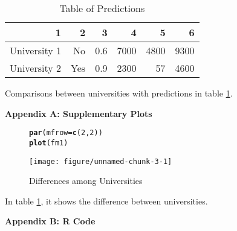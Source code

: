 \documentclass{article}\usepackage[]{graphicx}\usepackage[]{color}
\makeatletter
\def\maxwidth{ %
  \ifdim\Gin@nat@width>\linewidth
    \linewidth
  \else
    \Gin@nat@width
  \fi
}
\newcommand{\hlnum}[1]{\textcolor[rgb]{0.686,0.059,0.569}{#1}}%
\newcommand{\hlstd}[1]{\textcolor[rgb]{0.345,0.345,0.345}{#1}}%
\newcommand{\hlkwc}[1]{\textcolor[rgb]{0.333,0.667,0.333}{#1}}%
\newcommand{\hlkwd}[1]{\textcolor[rgb]{0.737,0.353,0.396}{\textbf{#1}}}%
\newenvironment{kframe}{%
 \def\at@end@of@kframe{}%
 \ifinner\ifhmode%
  \def\at@end@of@kframe{\end{minipage}}%
  \begin{minipage}{\columnwidth}%
 \fi\fi%
 \def\FrameCommand##1{\hskip\@totalleftmargin \hskip-\fboxsep
 \colorbox{shadecolor}{##1}\hskip-\fboxsep
     \hskip-\linewidth \hskip-\@totalleftmargin \hskip\columnwidth}%
 \MakeFramed {\advance\hsize-\width
   \@totalleftmargin\z@ \linewidth\hsize
   \@setminipage}}%
 {\par\unskip\endMakeFramed%
 \at@end@of@kframe}
\newenvironment{knitrout}{}{} %
\makeatother
\begin{document}


\begin{table}[ht]
\centering
\begin{tabular}{|rrrrrr|}
  \hline
1 & 2 & 3 & 4 & 5 & 6 \\ 
  \hline
University 1 & No & 0.6 & 7000 & 4800 & 9300 \\ 
  University 2 & Yes & 0.9 & 2300 & 57 & 4600 \\ 
   \hline
\end{tabular}
\caption{Table of Predictions} 
\label{predictions}
\end{table}




Comparisons between universities with predictions in table \ref{predictions}.

\newpage
\noindent \Large{{\bf Appendix A: Supplementary Plots}}
\begin{figure}[h!]
\begin{center}
%
%
\begin{knitrout}
\color{fgcolor}\begin{kframe}
\begin{alltt}
\hlkwd{par}\hlstd{(}\hlkwc{mfrow}\hlstd{=}\hlkwd{c}\hlstd{(}\hlnum{2}\hlstd{,}\hlnum{2}\hlstd{))}
\hlkwd{plot}\hlstd{(fm1)}
\end{alltt}
\end{kframe}
\texttt{[image: figure/unnamed-chunk-3-1]} 

\end{knitrout}

\caption{Differences among Universities}
\label{Summary Chart}
\end{center}
\end{figure}

In table \ref{Summary Chart}, it shows the difference between universities. 

%  

\newpage
\noindent \Large{{\bf Appendix B: R Code}}

\end{document}
